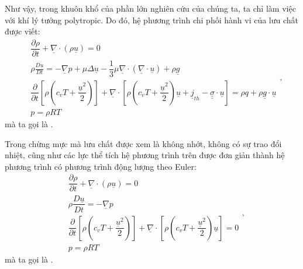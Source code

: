 \documentclass[../../../main.tex]{subfiles}
\begin{document}
    Như vậy, trong khuôn khổ của phần lớn nghiên cứu của chúng ta, ta chỉ làm việc với khí lý tưởng polytropic. Do đó, hệ phương trình chi phối hành vi của lưu chất được viết:
        \begin{equation}\label{eq:reel}
            \boxed{
                \begin{aligned}
                    &\dfrac{\partial\rho}{\partial t}+\underline{\nabla}\cdot\left(\rho\underline{u}\right)=0\\[10pt]
                    &\rho\frac{D\underline{u}}{Dt}=-\underline{\nabla}p+\mu\Delta\underline{u}-\dfrac{1}{3}\mu\underline{\nabla}\cdot\left(\underline{\nabla}\cdot\underline{u}\right)+\rho\underline{g}\\[10pt]
                    &\dfrac{\partial}{\partial t}\left[\rho\left(c_vT+\dfrac{\underline{u}^2}{2}\right)\right]+\underline{\nabla}\cdot\left[\rho\left(c_vT+\dfrac{\underline{u}^2}{2}\right)\underline{u}+\underline{j}_{th}-\underline{\underline{\sigma}}\cdot\underline{u}\right]=\rho q+\rho\underline{g}\cdot\underline{u}\\[10pt]
                    &p=\rho RT
                \end{aligned}
            },
        \end{equation}
    mà ta gọi là .

    Trong chừng mực mà lưu chất được xem là không nhớt, không có sự trao đổi nhiệt, cũng như các lực thể tích hệ phương trình trên được đơn giản thành hệ phương trình có phương trình động lượng theo Euler:
        \begin{equation}\label{eq:parfait}
            \boxed{
                \begin{aligned}
                    &\dfrac{\partial\rho}{\partial t}+\underline{\nabla}\cdot\left(\rho \underline{u}\right)=0\\[10pt]
                    &\rho\dfrac{D\underline{u}}{Dt}=-\underline{\nabla}p\\[10pt]
                    &\dfrac{\partial}{\partial t}\left[\rho\left(c_vT+\dfrac{ \underline{u}^2}{2}\right)\right]+\underline{\nabla}\cdot\left[\rho\left(c_vT+\dfrac{\underline{u}^2}{2}\right)\underline{u} \right]=0\\[10pt]
                    &p=\rho RT
                \end{aligned}
	        },
        \end{equation}
    mà ta gọi là .
\end{document}
